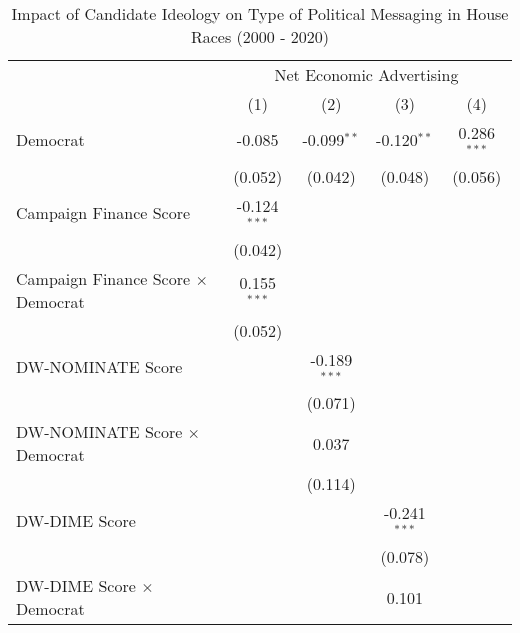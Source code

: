 
\begin{table}[htbp]
   \caption{Impact of Candidate Ideology on Type of Political Messaging in House Races (2000 - 2020)}
   \bigskip
   \centering
   \small
   \begin{tabular}{lcccc}
      \toprule
       & \multicolumn{4}{c}{Net Economic Advertising}\\
                                                                & (1)            & (2)            & (3)            & (4)\\  
      \midrule 
      Democrat                                                  & -0.085         & -0.099$^{**}$  & -0.120$^{**}$  & 0.286$^{***}$\\   
                                                                & (0.052)        & (0.042)        & (0.048)        & (0.056)\\   
      Campaign Finance Score                                    & -0.124$^{***}$ &                &                &   \\   
                                                                & (0.042)        &                &                &   \\   
      Campaign Finance Score $\times$ Democrat                  & 0.155$^{***}$  &                &                &   \\   
                                                                & (0.052)        &                &                &   \\   
      DW-NOMINATE Score                                         &                & -0.189$^{***}$ &                &   \\   
                                                                &                & (0.071)        &                &   \\   
      DW-NOMINATE Score $\times$ Democrat                       &                & 0.037          &                &   \\   
                                                                &                & (0.114)        &                &   \\   
      DW-DIME Score                                             &                &                & -0.241$^{***}$ &   \\   
                                                                &                &                & (0.078)        &   \\   
      DW-DIME Score $\times$ Democrat                           &                &                & 0.101          &   \\   

\end{tabular}
\end{table}
